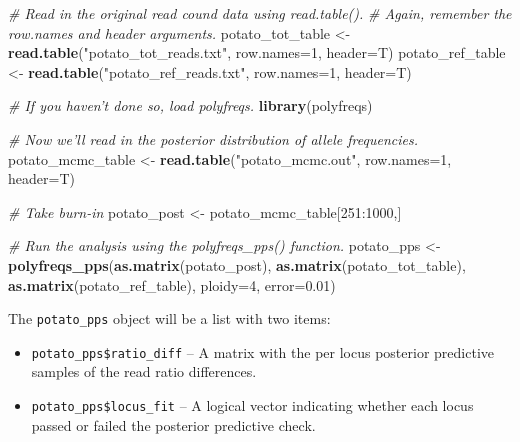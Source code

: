 \documentclass[]{article}
\newenvironment{Shaded}{\begin{snugshade}}{\end{snugshade}}
\newcommand{\KeywordTok}[1]{\textcolor[rgb]{0.13,0.29,0.53}{\textbf{{#1}}}}
\newcommand{\DataTypeTok}[1]{\textcolor[rgb]{0.13,0.29,0.53}{{#1}}}
\newcommand{\DecValTok}[1]{\textcolor[rgb]{0.00,0.00,0.81}{{#1}}}
\newcommand{\FloatTok}[1]{\textcolor[rgb]{0.00,0.00,0.81}{{#1}}}
\newcommand{\StringTok}[1]{\textcolor[rgb]{0.31,0.60,0.02}{{#1}}}
\newcommand{\CommentTok}[1]{\textcolor[rgb]{0.56,0.35,0.01}{\textit{{#1}}}}
\newcommand{\NormalTok}[1]{{#1}}
\begin{document}
\begin{Shaded}
\begin{Highlighting}[]
\CommentTok{# Read in the original read cound data using read.table().}
\CommentTok{# Again, remember the row.names and header arguments.}
\NormalTok{potato_tot_table <-}\StringTok{ }\KeywordTok{read.table}\NormalTok{(}\StringTok{"potato_tot_reads.txt"}\NormalTok{, }\DataTypeTok{row.names=}\DecValTok{1}\NormalTok{, }\DataTypeTok{header=}\NormalTok{T)}
\NormalTok{potato_ref_table <-}\StringTok{ }\KeywordTok{read.table}\NormalTok{(}\StringTok{"potato_ref_reads.txt"}\NormalTok{, }\DataTypeTok{row.names=}\DecValTok{1}\NormalTok{, }\DataTypeTok{header=}\NormalTok{T)}

\CommentTok{# If you haven't done so, load polyfreqs.}
\KeywordTok{library}\NormalTok{(polyfreqs)}

\CommentTok{# Now we'll read in the posterior distribution of allele frequencies.}
\NormalTok{potato_mcmc_table <-}\StringTok{ }\KeywordTok{read.table}\NormalTok{(}\StringTok{"potato_mcmc.out"}\NormalTok{, }\DataTypeTok{row.names=}\DecValTok{1}\NormalTok{, }\DataTypeTok{header=}\NormalTok{T)}

\CommentTok{# Take burn-in}
\NormalTok{potato_post <-}\StringTok{ }\NormalTok{potato_mcmc_table[}\DecValTok{251}\NormalTok{:}\DecValTok{1000}\NormalTok{,]}


\CommentTok{# Run the analysis using the polyfreqs_pps() function.}
\NormalTok{potato_pps <-}\StringTok{ }\KeywordTok{polyfreqs_pps}\NormalTok{(}\KeywordTok{as.matrix}\NormalTok{(potato_post), }
                            \KeywordTok{as.matrix}\NormalTok{(potato_tot_table), }
                            \KeywordTok{as.matrix}\NormalTok{(potato_ref_table), }
                            \DataTypeTok{ploidy=}\DecValTok{4}\NormalTok{, }\DataTypeTok{error=}\FloatTok{0.01}\NormalTok{)}
\end{Highlighting}
\end{Shaded}

The \texttt{potato\_pps} object will be a list with two items:

\begin{itemize}
\item
  \texttt{potato\_pps\$ratio\_diff} -- A matrix with the per locus
  posterior predictive samples of the read ratio differences.
\item
  \texttt{potato\_pps\$locus\_fit} -- A logical vector indicating
  whether each locus passed or failed the posterior predictive check.
\end{itemize}
\end{document}
